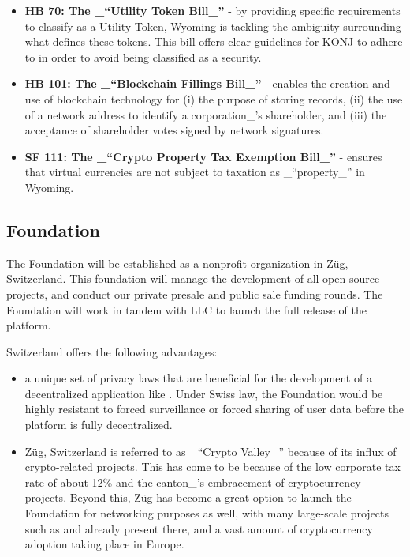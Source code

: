 \documentclass{kwp-builder}
\begin{document}
\begin{itemize}
	\item \textbf{HB 70: The \_{“}Utility Token Bill\_{”}} - by providing specific requirements to classify as a Utility Token, Wyoming is tackling the ambiguity surrounding what defines these tokens. This bill offers clear guidelines for KONJ to adhere to in order to avoid being classified as a security.
	
	\item \textbf{HB 101: The \_{“}Blockchain Fillings Bill\_{”}} - enables the creation and use of blockchain technology for (i) the purpose of storing records, (ii) the use of a network address to identify a corporation\_{’}s shareholder, and (iii) the acceptance of shareholder votes signed by network signatures.
		
	\item \textbf{SF 111: The \_{“}Crypto Property Tax Exemption Bill\_{”}} - ensures that virtual currencies are not subject to taxation as \_{“}property\_{”} in Wyoming.

\end{itemize}
\subsection{\konjure Foundation}

\tab The \konjure Foundation will be established as a nonprofit organization in Züg, Switzerland. This foundation will manage the development of all open-source \konjure projects, and conduct our private presale and public sale funding rounds. The \konjure Foundation will work in tandem with \konjure LLC to launch the full release of the platform.

Switzerland offers the following advantages:

\begin{itemize}
	\item a unique set of privacy laws that are beneficial for the development of a decentralized application like \konjure. Under Swiss law, the \konjure Foundation would be highly resistant to forced surveillance or forced sharing of user data before the platform is fully decentralized.
	
	\item Züg, Switzerland is referred to as \_{“}Crypto Valley\_{”} because of its influx of crypto-related projects. This has come to be because of the low corporate tax rate of about 12\% and the canton\_{’}s embracement of cryptocurrency projects. Beyond this, Züg has become a great option to launch the \konjure Foundation for networking purposes as well, with many large-scale projects such as \cardano and \ethereum already present there, and a vast amount of cryptocurrency adoption taking place in Europe.
\end{itemize}
\end{document}
